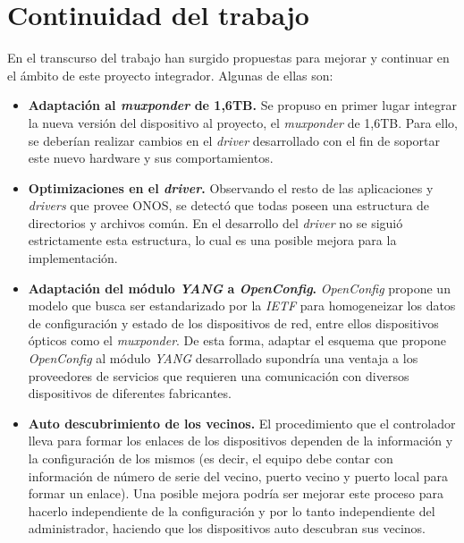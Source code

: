 \section{Continuidad del trabajo} %

En el transcurso del trabajo han surgido propuestas para mejorar y continuar en el ámbito de este proyecto integrador. Algunas de ellas son:

\begin{itemize}

    \item \textbf{Adaptación al \textit{muxponder} de 1,6TB.} Se propuso en primer lugar integrar la nueva versión del dispositivo al proyecto, el \textit{muxponder} de 1,6TB. Para ello, se deberían realizar cambios en el \textit{driver} desarrollado con el fin de soportar este nuevo hardware y sus comportamientos.

    
    \item \textbf{Optimizaciones en el \textit{driver}.} Observando el resto de las aplicaciones y \textit{drivers} que provee ONOS, se detectó que todas poseen una estructura de directorios y archivos común. En el desarrollo del \textit{driver} no se siguió estrictamente esta estructura, lo cual es una posible mejora para la implementación.

    \item \textbf{Adaptación del módulo \textit{YANG} a \textit{OpenConfig}.} \textit{OpenConfig} propone un modelo que busca ser estandarizado por la \textit{IETF} para homogeneizar los datos de configuración y estado de los dispositivos de red, entre ellos dispositivos ópticos como el \textit{muxponder}. De esta forma, adaptar el esquema que propone \textit{OpenConfig} al módulo \textit{YANG} desarrollado supondría una ventaja a los proveedores de servicios que requieren una comunicación con diversos dispositivos de diferentes fabricantes.
    
    \item \textbf{Auto descubrimiento de los vecinos.} El procedimiento que el controlador lleva para formar los enlaces de los dispositivos dependen de la información y la configuración de los mismos (es decir, el equipo debe contar con información de número de serie del vecino, puerto vecino y puerto local para formar un enlace). Una posible mejora podría ser mejorar este proceso para hacerlo independiente de la configuración y por lo tanto independiente del administrador, haciendo que los dispositivos auto descubran sus vecinos. 

\end{itemize}

